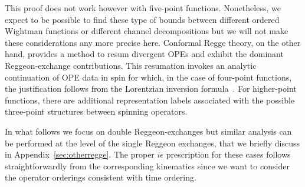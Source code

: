 This proof does not work however with five-point functions. Nonetheless, we expect to be possible to find these type of bounds between different ordered Wightman functions or different channel decompositions but we will not make these considerations any more precise here.
Conformal Regge theory, on the other hand, provides a method to resum divergent OPEs and exhibit the dominant Reggeon-exchange contributions. This resumation invokes an analytic continuation of OPE data in spin for which, in the case of four-point functions, the justification follows from the Lorentzian inversion formula~\cite{Caron-Huot:2017vep,Simmons-Duffin:2017nub}. For higher-point functions, there are additional representation labels associated with the possible three-point structures between spinning operators.

In what follows we focus on double Reggeon-exchanges but similar analysis can be performed at the level of the single Reggeon exchanges, that we briefly discuss in Appendix~\ref{sec:otherregge}. The proper $i\epsilon$ prescription for these  cases follows straightforwardly from the corresponding kinematics since we want to consider the operator orderings consistent with time ordering.

